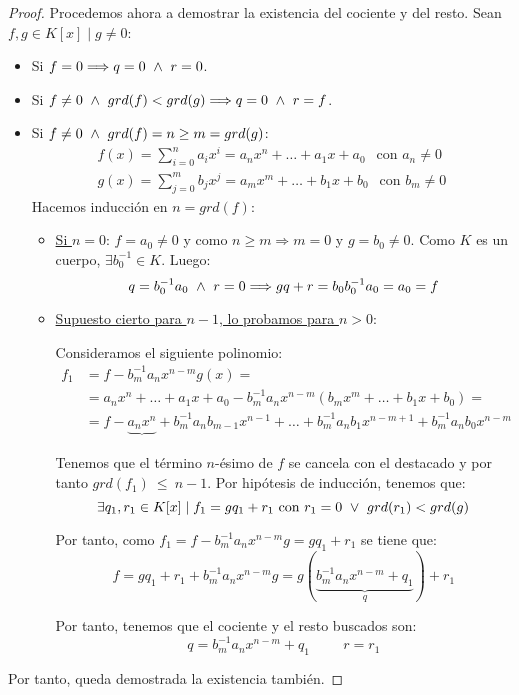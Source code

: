 \begin{proof}
    Procedemos ahora a demostrar la existencia del cociente y del resto. Sean $f,g \in K[x] \mid g\neq 0$:
    \begin{itemize}
        \item Si $f=0 \Longrightarrow q=0 \ \land \  r= 0$.
        \item Si $f \neq 0 \ \land \  grd(f) < grd(g) \Longrightarrow q=0 \ \land \  r = f$.
        \item Si $f\neq 0\ \land \  grd(f) = n \geq m = grd(g)$:
        \begin{gather*}
            f(x) = \sum_{i=0}^n a_ix^i = a_nx^n + \ldots + a_1x + a_0~~\mbox{ con } a_n \neq 0 \\
            g(x) = \sum_{j=0}^m b_jx^j = a_mx^m + \ldots + b_1x + b_0~~\mbox{ con } b_m \neq 0
        \end{gather*}
        Hacemos inducción en $n = grd(f)$:
        \begin{itemize}
            \item \ul{Si $n=0$}: $f=a_0 \neq 0$ y como $n \geq m \Longrightarrow m = 0$ y $g = b_0 \neq 0$.
            Como $K$ es un cuerpo, $\exists b_0^{-1} \in K$. Luego:
            $$q=b_0^{-1}a_0 \ \land \  r=0 \Longrightarrow gq+r = b_0 b_0^{-1} a_0 = a_0 = f$$
    
            \item \ul{Supuesto cierto para $n-1$, lo probamos para $n>0$}:
            
            Consideramos el siguiente polinomio:
            \begin{equation*}
                \begin{split}
                    f_1 &= f-b_m^{-1}a_n x^{n-m}g(x) =\\
                    & = a_nx^n + \ldots + a_1x + a_0 - b_m^{-1} a_n x^{n-m} (b_mx^m + \ldots + b_1x + b_0) =\\
                    & = f-\underbrace{a_nx^n} + b_m^{-1} a_n b_{m-1} x^{n-1} + \ldots + b_m^{-1}a_nb_1x^{n-m+1} + b_m^{-1}a_nb_0x^{n-m}
                \end{split}
            \end{equation*}
            
            Tenemos que el término $n$-ésimo de $f$ se cancela con el destacado y por tanto $grd(f_1)~\leq~n-1$.
            Por hipótesis de inducción, tenemos que:
            $$\exists q_1,r_1 \in K[x] \mid f_1 = gq_1 + r_1 \mbox{ con } r_1=0 \ \lor \  grd(r_1) < grd(g)$$
    
            Por tanto, como $f_1=f-b_m^{-1}a_nx^{n-m}g = gq_1+r_1$ se tiene que:
            \begin{equation*}
                f= gq_1+r_1 + b_m^{-1}a_nx^{n-m}g =g(\underbrace{b_m^{-1}a_nx^{n-m}+q_1}_q)+r_1
            \end{equation*}
            
            Por tanto, tenemos que el cociente y el resto buscados son: $$q = b_m^{-1}a_nx^{n-m} + q_1 \hspace{1cm} r=r_1$$
        \end{itemize}
    \end{itemize}
    Por tanto, queda demostrada la existencia también.
\end{proof}

